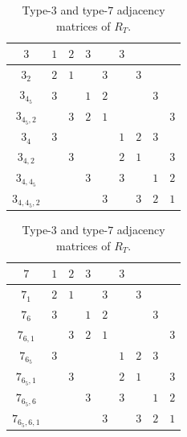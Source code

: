 \documentclass{amsart}
\theoremstyle{definition}
\theoremstyle{remark}
\begin{document}


       

\begin{table}
\begin{tabular}{|c||c|c|c|c|c|c|c|c|}
 \hhline{|=#=|=|=|=|=|=|=|=|}
$3$ & $1$ & $2$ & $3$ &  & $3$ &  &  & \\ \hline
$3_2$ & $2$ & $1$ &  & $3$ &  & $3$ &  & \\ \hline
$3_{4_5}$ & $3$ &  & $1$ & $2$ &  &  & $3$ & \\ \hline
$3_{4_5,2}$ &  & $3$ & $2$ & $1$ &  &  &  & $3$ \\ \hline
$3_{4}$ & $3$ &  &  &  & $1$ & $2$ & $3$ & \\ \hline
$3_{4,2}$ &  & $3$ &  &  & $2$ & $1$ &  & $3$ \\ \hline
$3_{4,4_5}$ &  &  & $3$ &  & $3$ &  & $1$ & $2$ \\ \hline
$3_{4,4_5,2}$ &  &  &  & $3$ &  & $3$ & $2$ & $1$\\ \hline
\end{tabular} \hspace{20pt}
\begin{tabular}{|c||c|c|c|c|c|c|c|c|}
 \hhline{|=#=|=|=|=|=|=|=|=|}
$7$ & $1$ & $2$ & $3$ &  & $3$ &  &  & \\ \hline
$7_1$ & $2$ & $1$ &  & $3$ &  & $3$ &  & \\ \hline
$7_{6}$ & $3$ &  & $1$ & $2$ &  &  & $3$ & \\ \hline
$7_{6,1}$ &  & $3$ & $2$ & $1$ &  &  &  & $3$ \\ \hline
$7_{6_5}$ & $3$ &  &  &  & $1$ & $2$ & $3$ & \\ \hline
$7_{6_5,1}$ &  & $3$ &  &  & $2$ & $1$ &  & $3$ \\ \hline
$7_{6_5,6}$ &  &  & $3$ &  & $3$ &  & $1$ & $2$ \\ \hline
$7_{6_5,6,1}$ &  &  &  & $3$ &  & $3$ & $2$ & $1$\\ \hline
\end{tabular}
\caption{Type-$3$ and type-$7$ adjacency matrices of $R_T$.}\label{tr1}
\end{table}
\end{document}
